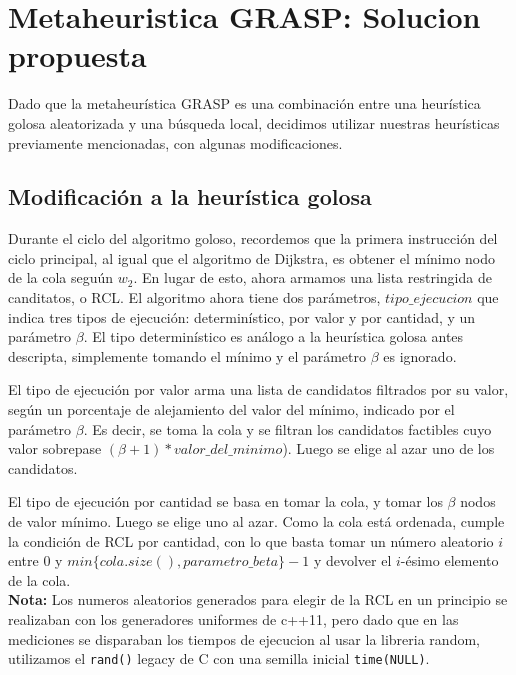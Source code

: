   \section{Metaheuristica GRASP: Solucion propuesta}

Dado que la metaheur\'istica GRASP es una combinaci\'on entre una heur\'istica golosa aleatorizada y una b\'usqueda local, decidimos utilizar nuestras heur\'isticas previamente mencionadas, con algunas modificaciones.

\subsection{Modificaci\'on a la heur\'istica golosa}

\vspace{2mm}

Durante el ciclo del algoritmo goloso, recordemos que la primera instrucci\'on del ciclo principal, al igual que el algoritmo de Dijkstra, es obtener el m\'inimo nodo de la cola segu\'un $w_2$. En lugar de esto, ahora armamos una lista restringida de canditatos, o RCL. El algoritmo ahora tiene dos par\'ametros, $tipo\_ejecucion$ que indica tres tipos de ejecuci\'on: determin\'istico, por valor y por cantidad, y un par\'ametro $\beta$. El tipo determin\'istico es an\'alogo a la heur\'istica golosa antes descripta, simplemente tomando el m\'inimo y el par\'ametro $\beta$ es ignorado.

\vspace{2mm}

El tipo de ejecuci\'on por valor arma una lista de candidatos filtrados por su valor, seg\'un un porcentaje de alejamiento del valor del m\'inimo, indicado por el par\'ametro $\beta$. Es decir, se toma la cola y se filtran los candidatos factibles cuyo valor sobrepase $(\beta + 1)*valor\_del\_minimo$). Luego se elige al azar uno de los candidatos. 
\vspace{2mm}

El tipo de ejecuci\'on por cantidad se basa en tomar la cola, y tomar los $\beta$ nodos de valor m\'inimo. Luego se elige uno al azar. Como la cola est\'a ordenada, cumple la condici\'on de RCL por cantidad, con lo que basta tomar un n\'umero aleatorio $i$ entre $0$ y  $min\{cola.size(), parametro\_beta\} -1$ y devolver el $i$-\'esimo elemento de la cola.\\
\textbf{Nota: } Los numeros aleatorios generados para elegir de la RCL en un principio se realizaban con los generadores uniformes de c++11, pero dado que en las mediciones se disparaban los tiempos de ejecucion al usar la libreria random, utilizamos el \texttt{rand()} legacy de C con una semilla inicial \texttt{time(NULL)}.
\vspace{2mm}

